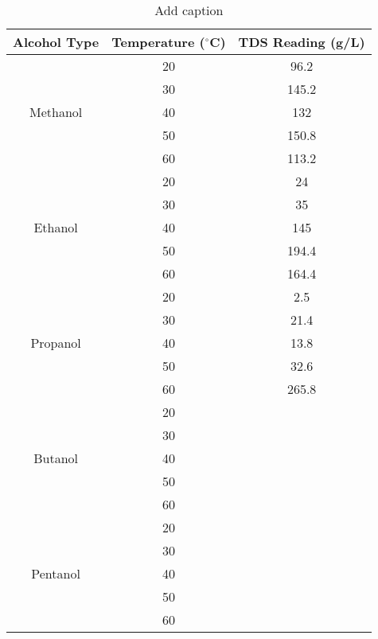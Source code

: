 

\begin{table}[H]
  \centering
  \caption{Add caption}
    \begin{tabular}{ccc}
    \toprule
    Alcohol Type & Temperature ($^\circ$C) & TDS Reading (g/L) \\
    \midrule
    \multirow{5}[10]{*}{Methanol} & 20    & 96.2 \\
\cmidrule{2-3}          & 30    & 145.2 \\
\cmidrule{2-3}          & 40    & 132 \\
\cmidrule{2-3}          & 50    & 150.8 \\
\cmidrule{2-3}          & 60    & 113.2 \\
    \midrule
    \multirow{5}[10]{*}{Ethanol} & 20    & 24 \\
\cmidrule{2-3}          & 30    & 35 \\
\cmidrule{2-3}          & 40    & 145 \\
\cmidrule{2-3}          & 50    & 194.4 \\
\cmidrule{2-3}          & 60    & 164.4 \\
    \midrule
    \multirow{5}[10]{*}{Propanol} & 20    & 2.5 \\
\cmidrule{2-3}          & 30    & 21.4 \\
\cmidrule{2-3}          & 40    & 13.8 \\
\cmidrule{2-3}          & 50    & 32.6 \\
\cmidrule{2-3}          & 60    & 265.8 \\
    \midrule
    \multirow{5}[10]{*}{Butanol} & 20    &  \\
\cmidrule{2-3}          & 30    &  \\
\cmidrule{2-3}          & 40    &  \\
\cmidrule{2-3}          & 50    &  \\
\cmidrule{2-3}          & 60    &  \\
    \midrule
    \multirow{5}[10]{*}{Pentanol} & 20    &  \\
\cmidrule{2-3}          & 30    &  \\
\cmidrule{2-3}          & 40    &  \\
\cmidrule{2-3}          & 50    &  \\
\cmidrule{2-3}          & 60    &  \\
    \bottomrule
    \end{tabular}%
  \label{tab:addlabel}%
\end{table}%

